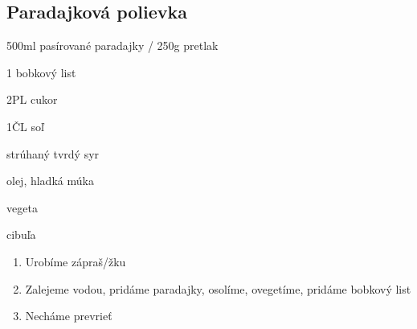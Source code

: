 \setcounter{step}{0}
\subsection{Paradajková polievka}

\begin{ingredient}
\def\portions{4}%

\begin{main}
	\item 500ml pasírované paradajky / 250g pretlak
	\item 1 bobkový list
	\item 2PL cukor
	\item 1ČL soľ
	\item strúhaný tvrdý syr
	\item olej, hladká múka
	\item vegeta
	\item cibuľa
\end{main}
\end{ingredient}
\begin{recipe}

\begin{enumerate}

\item{Urobíme zápraš/žku}
\item{Zalejeme vodou, pridáme paradajky, osolíme, ovegetíme, pridáme bobkový list}
\item{Necháme prevrieť}

\end{enumerate}
\end{recipe}

\begin{notes}

\end{notes}
\clearpage	